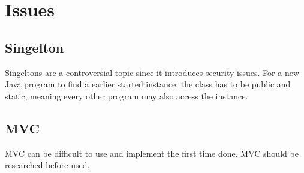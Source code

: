 \chapter{Issues}
\section{Singelton}
	Singeltons are a controversial topic since it introduces security issues. For a new Java program to find a earlier started instance, the class has to be public and static, meaning every other program may also access the instance. 

\section{MVC}
	MVC can be difficult to use and implement the first time done. MVC should be researched before used.